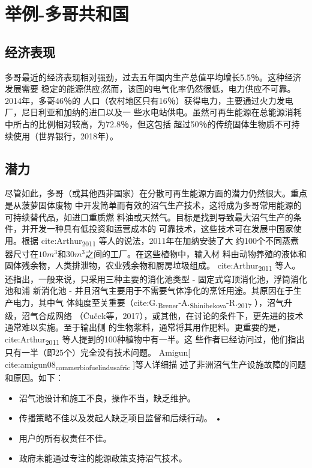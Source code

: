 \documentclass[11pt]{article}
\begin{document}
\section{举例-多哥共和国}
\label{sec:org70e972c}
\subsection{经济表现}
\label{sec:orgec9c966}
多哥最近的经济表现相对强劲，过去五年国内生产总值平均增长5.5％。这种经济发展需要
稳定的能源供应;然而，该国的电气化率仍然很低，电力供应不可靠。 2014年，多哥46％的
人口（农村地区只有16％）获得电力，主要通过火力发电厂，尼日利亚和加纳的进口以及一
些水电站供电。虽然可再生能源在总能源消耗中所占的比例相对较高，为72.8％，但这包括
超过50％的传统固体生物质不可持续使用（世界银行，2018年）。

\subsection{潜力}
\label{sec:orgab982e4}
尽管如此，多哥（或其他西非国家）在分散可再生能源方面的潜力仍然很大。重点是从菠萝固体废物
中开发简单而有效的沼气生产技术，这将成为多哥常用能源的可持续替代品，如进口重质燃
料油或天然气。目标是找到导致最大沼气生产的条件，并开发一种具有低投资和运营成本的
可靠技术，这些技术可在发展中国家使用。根据 cite:Arthur\textsubscript{2011} 等人的说法，2011年在加纳安装了大
约100个不同蒸煮器尺寸在\(10 m^3\)和\(30 m^3\)之间的工厂。在这些植物中，输入材
料由动物养殖的液体和固体残余物，人类排泄物，农业残余物和厨房垃圾组成。
cite:Arthur\textsubscript{2011} 等人。
还指出，一般来说，只采用三种主要的消化池类型 - 固定式穹顶消化池，浮筒消化池和浦
新消化池 - 并且沼气主要用于不需要气体净化的烹饪用途。其原因在于生产电力，其中气
体纯度至关重要（cite:G.\textsubscript{Brener}-A.\textsubscript{Shinibekova}-R.\textsubscript{2017} ），沼气升级，沼气合成网络
（Čuček等，2017），或其他，在讨论的条件下，更先进的技术通常难以实施。至于输出侧
的生物浆料，通常将其用作肥料。更重要的是，cite:Arthur\textsubscript{2011} 等人提到的100种植物中有一半。这
些作者已经访问过，他们指出只有一半（即25个）完全没有技术问题。 Amigun[ cite:amigun08\textsubscript{commer}\textsubscript{biofuel}\textsubscript{indus}\textsubscript{afric} ]等人详细描
述了非洲沼气生产设施故障的问题和原因。如下：

\begin{itemize}
\item 沼气池设计和施工不良，操作不当，缺乏维护。
\item 传播策略不佳以及发起人缺乏项目监督和后续行动。 •
\item 用户的所有权责任不佳。
\item 政府未能通过专注的能源政策支持沼气技术。
\end{itemize}
\end{document}
